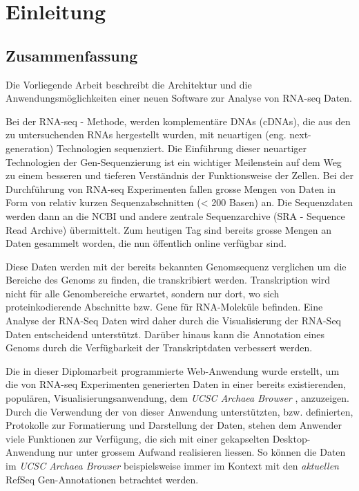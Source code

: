 \documentclass[a4paper]{thesis}
\begin{document}

\renewcommand\contentsname{Inhalt}
\tableofcontents
\listoftodos
\newpage
\section{Einleitung}
\subsection{Zusammenfassung}
Die Vorliegende Arbeit beschreibt die Architektur und die
Anwendungsmöglichkeiten einer neuen Software zur Analyse von RNA-seq Daten.

Bei der RNA-seq - Methode, werden komplementäre DNAs (cDNAs), die aus den zu
untersuchenden RNAs hergestellt wurden, mit neuartigen (eng. next-generation)
Technologien sequenziert. \cite{ausubel_rna-seq:_2010}
%
Die Einführung dieser neuartiger Technologien der Gen-Sequenzierung
ist ein wichtiger Meilenstein auf dem Weg zu einem besseren und
tieferen Verständnis der Funktionsweise der Zellen. Bei der Durchführung
von RNA-seq Experimenten fallen grosse Mengen von Daten in Form von
relativ kurzen Sequenzabschnitten (< 200 Basen) an. Die Sequenzdaten
werden dann an die NCBI und andere zentrale Sequenzarchive (SRA -
Sequence Read Archive) übermittelt. Zum heutigen Tag sind bereits
grosse Mengen an Daten gesammelt worden, die nun öffentlich
online verfügbar sind.

Diese Daten werden mit der bereits bekannten
Genomsequenz verglichen um die Bereiche des Genoms zu finden,
die transkribiert werden. Transkription wird nicht für
alle Genombereiche erwartet, sondern nur dort, wo sich proteinkodierende
Abschnitte bzw. Gene für RNA-Moleküle befinden. Eine Analyse der RNA-Seq
Daten wird daher durch die Visualisierung der RNA-Seq Daten entscheidend
unterstützt. Darüber hinaus kann die Annotation eines Genoms durch die
Verfügbarkeit der Transkriptdaten verbessert werden.

Die in dieser Diplomarbeit programmierte Web-Anwendung wurde erstellt, um
die von RNA-seq
Experimenten generierten Daten in einer bereits existierenden, populären,
Visualisierungsanwendung, dem {\em UCSC Archaea Browser}
\cite{schneider_ucsc_2006}, anzuzeigen. Durch die Verwendung der von dieser
Anwendung unterstützten, bzw. definierten, Protokolle zur Formatierung
und Darstellung der Daten, stehen dem Anwender viele Funktionen zur
Verfügung, die sich mit einer gekapselten Desktop-Anwendung nur unter
grossem Aufwand realisieren liessen. So können die Daten im {\em UCSC Archaea
Browser} beispielsweise immer im Kontext mit den {\em aktuellen} RefSeq
Gen-Annotationen betrachtet werden.
\end{document}
